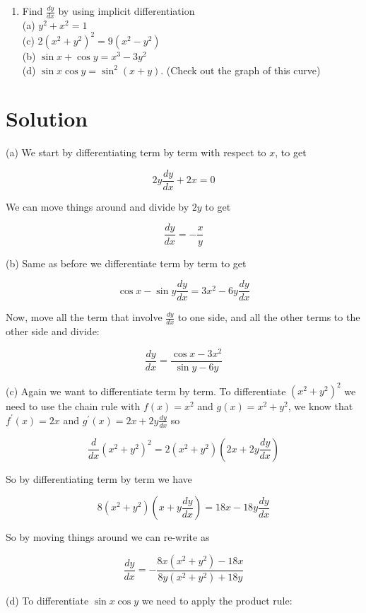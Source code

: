 \documentclass[10pt]{article}
\begin{document}
\begin{enumerate}
  \item Find $\frac{d y}{d x}$ by using implicit differentiation\\
(a) $y^{2}+x^{2}=1$\\
(c) $2\left(x^{2}+y^{2}\right)^{2}=9\left(x^{2}-y^{2}\right)$\\
(b) $\sin x+\cos y=x^{3}-3 y^{2}$\\
(d) $\sin x \cos y=\sin ^{2}(x+y)$. (Check out the graph of this curve)
\end{enumerate}

\section*{Solution}
(a) We start by differentiating term by term with respect to $x$, to get

$$
2 y \frac{d y}{d x}+2 x=0
$$

We can move things around and divide by $2 y$ to get

$$
\frac{d y}{d x}=-\frac{x}{y}
$$

(b) Same as before we differentiate term by term to get

$$
\cos x-\sin y \frac{d y}{d x}=3 x^{2}-6 y \frac{d y}{d x}
$$

Now, move all the term that involve $\frac{d y}{d x}$ to one side, and all the other terms to the other side and divide:

$$
\frac{d y}{d x}=\frac{\cos x-3 x^{2}}{\sin y-6 y}
$$

(c) Again we want to differentiate term by term. To differentiate $\left(x^{2}+y^{2}\right)^{2}$ we need to use the chain rule with $f(x)=x^{2}$ and $g(x)=x^{2}+y^{2}$, we know that $f^{\prime}(x)=2 x$ and $g^{\prime}(x)=2 x+2 y \frac{d y}{d x}$ so

$$
\frac{d}{d x}\left(x^{2}+y^{2}\right)^{2}=2\left(x^{2}+y^{2}\right)\left(2 x+2 y \frac{d y}{d x}\right)
$$

So by differentiating term by term we have

$$
8\left(x^{2}+y^{2}\right)\left(x+y \frac{d y}{d x}\right)=18 x-18 y \frac{d y}{d x}
$$

So by moving things around we can re-write as

$$
\frac{d y}{d x}=-\frac{8 x\left(x^{2}+y^{2}\right)-18 x}{8 y\left(x^{2}+y^{2}\right)+18 y}
$$

(d) To differentiate $\sin x \cos y$ we need to apply the product rule:
\end{document}
